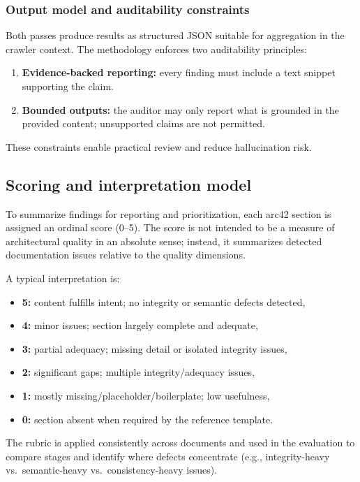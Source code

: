 \subsubsection{Output model and auditability constraints}
Both passes produce results as structured JSON suitable for aggregation in the crawler context. The methodology enforces two auditability principles:
\begin{enumerate}
    \item \textbf{Evidence-backed reporting:} every finding must include a text snippet supporting the claim.
    \item \textbf{Bounded outputs:} the auditor may only report what is grounded in the provided content; unsupported claims are not permitted.
\end{enumerate}
These constraints enable practical review and reduce hallucination risk.


\subsection{Scoring and interpretation model}
To summarize findings for reporting and prioritization, each arc42 section is assigned an ordinal score (0--5). The score is not intended to be a measure of architectural quality in an absolute sense; instead, it summarizes detected documentation issues relative to the quality dimensions.

A typical interpretation is:
\begin{itemize}
    \item \textbf{5:} content fulfills intent; no integrity or semantic defects detected,
    \item \textbf{4:} minor issues; section largely complete and adequate,
    \item \textbf{3:} partial adequacy; missing detail or isolated integrity issues,
    \item \textbf{2:} significant gaps; multiple integrity/adequacy issues,
    \item \textbf{1:} mostly missing/placeholder/boilerplate; low usefulness,
    \item \textbf{0:} section absent when required by the reference template.
\end{itemize}

The rubric is applied consistently across documents and used in the evaluation to compare stages and identify where defects concentrate (e.g., integrity-heavy vs.\ semantic-heavy vs.\ consistency-heavy issues).


